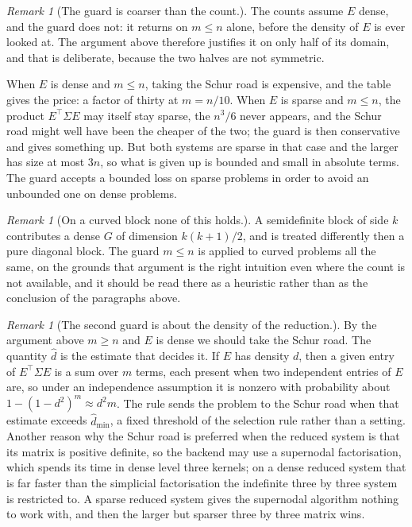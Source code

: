\documentclass[a4paper,11pt]{book}
\theoremstyle{plain}
\theoremstyle{definition}
\theoremstyle{remark}
\newtheorem{remark}[theorem]{Remark}
\numberwithin{equation}{chapter}
\numberwithin{algorithm}{chapter}
\begin{document}
	\begin{remark}[The guard is coarser than the count.]
	The counts assume $E$ dense, and the guard does not: it returns on $m\leq n$
	alone, before the density of $E$ is ever looked at. The argument above
	therefore justifies it on only half of its domain, and that is deliberate,
	because the two halves are not symmetric.

	When $E$ is dense and $m\leq n$, taking the Schur road is expensive, and the
	table gives the price: a factor of thirty at $m=n/10$. When $E$ is sparse and
	$m\leq n$, the product $E^{\top}\Sigma E$ may itself stay sparse, the $n^3/6$
	never appears, and the Schur road might well have been the cheaper of the two;
	the guard is then conservative and gives something up. But both systems are
	sparse in that case and the larger has size at most $3n$, so what is given up
	is bounded and small in absolute terms. The guard accepts a bounded loss on
	sparse problems in order to avoid an unbounded one on dense problems.
\end{remark}


	\begin{remark}[On a curved block none of this holds.]
	A semidefinite block of side $k$ contributes a dense $G$ of dimension
	$k(k+1)/2$, and is treated differently then a pure diagonal block. The guard $m\leq n$ is applied to curved
	problems all the same, on the grounds that argument is the right
	intuition even where the count is not available, and it should be read there
	as a heuristic rather than as the conclusion of the paragraphs above.
	\end{remark}

	\begin{remark}[The second guard is about the density of the reduction.]
	By the argument above $m\geq n$ and $E$ is dense we should take the Schur road. The quantity $\hat d$ is the estimate that decides it. If $E$ has
	density $d$, then a given entry of $E^{\top}\Sigma E$ is a sum over $m$ terms,
	each present when two independent entries of $E$ are, so under an
	independence assumption it is nonzero with probability about $1-(1-d^2)^m \approx d^2m$. The rule
	sends the problem to the Schur road when that estimate exceeds
	$\hat d_{\min}$, a fixed threshold of the selection rule rather than a
	setting. Another reason why the Schur road is preferred when the reduced system is that its matrix is
	positive definite, so the backend may use a supernodal factorisation, which
	spends its time in dense level three kernels; on a dense reduced system that
	is far faster than the simplicial factorisation the indefinite three by three
	system is restricted to. A sparse reduced system gives the supernodal
	algorithm nothing to work with, and then the larger but sparser three by
	three matrix wins.
\end{remark}
  
\end{document}
